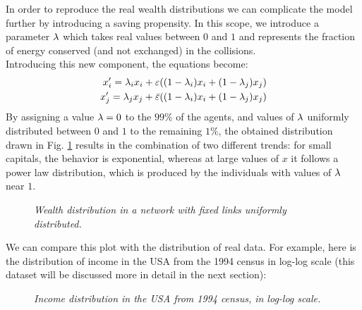 In order to reproduce the real wealth distributions we can complicate the model further by introducing a saving propensity.
In this scope, we introduce a parameter $\lambda$ which takes real values between $0$ and $1$ and represents the fraction of energy conserved (and not exchanged) in the collisions. \\
Introducing this new component, the equations become:
\begin{equation}
	\begin{split}
		x'_i = \lambda_ix_i + \varepsilon((1-\lambda_i)x_i + (1-\lambda_j)x_j) 	\\
		x'_j = \lambda_jx_j + \bar{\varepsilon}((1-\lambda_i)x_i + (1-\lambda_j)x_j) 	\\
	\end{split}
\end{equation}
By assigning a value $\lambda = 0$ to the $99 \%$ of the agents, and values of $\lambda$ uniformly distributed between $0$ and $1$ to the remaining $1\%$, the obtained distribution drawn in Fig. \ref{fig:savings} results in the combination of two different trends: for small capitals, the behavior is exponential, whereas at large values of $x$ it follows a power law distribution, which is produced by the individuals with values of $\lambda$ near $1$.
\begin{figure}[H]
    \centering
    \scalebox{.7}{}
    \caption{\emph{Wealth distribution in a network with fixed links uniformly distributed.}}
    \label{fig:savings}
\end{figure}
We can compare this plot with the distribution of real data.
For example, here is the distribution of income in the USA from the 1994 census in log-log scale (this dataset will be discussed more in detail in the next section):
\begin{figure}[H]
    \centering
    \scalebox{.7}{}
    \caption{\emph{Income distribution in the USA from 1994 census, in log-log scale.}}
    \label{fig:savingsLog}
\end{figure}
